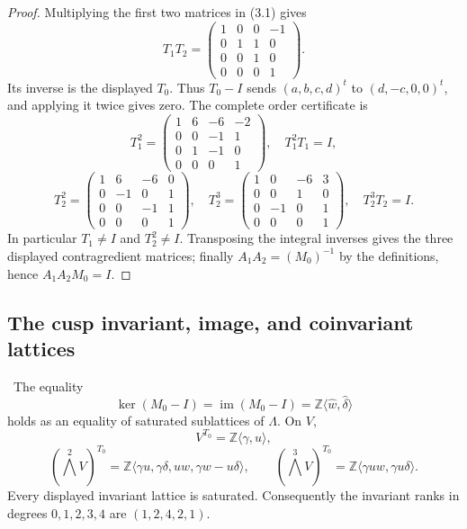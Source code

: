 \begin{proof}
Multiplying the first two matrices in (3.1) gives
\[
T_1T_2=
\begin{pmatrix}
1&0&0&-1\\0&1&1&0\\0&0&1&0\\0&0&0&1
\end{pmatrix}.
\]
Its inverse is the displayed $T_0$.  Thus
$T_0-I$ sends $(a,b,c,d)^t$ to $(d,-c,0,0)^t$, and applying it twice
gives zero.  The complete order certificate is
\[
T_1^2=
\begin{pmatrix}
1&6&-6&-2\\0&0&-1&1\\0&1&-1&0\\0&0&0&1
\end{pmatrix},
\quad T_1^2T_1=I,
\]
\[
T_2^2=
\begin{pmatrix}
1&6&-6&0\\0&-1&0&1\\0&0&-1&1\\0&0&0&1
\end{pmatrix},
\quad
T_2^3=
\begin{pmatrix}
1&0&-6&3\\0&0&1&0\\0&-1&0&1\\0&0&0&1
\end{pmatrix},
\quad T_2^3T_2=I.
\]
In particular $T_1\ne I$ and $T_2^2\ne I$.  Transposing the integral inverses gives
the three displayed contragredient matrices; finally
$A_1A_2=(M_0)^{-1}$ by the definitions, hence $A_1A_2M_0=I$.
\end{proof}

\subsection{The cusp invariant, image, and coinvariant lattices}

\begin{theorem}
\label{wb:thm:cusp-lattices}
\ The equality
\[
 \ker(M_0-I)=\operatorname{im}(M_0-I)
 =\mathbb Z\langle\widehat w,\widehat\delta\rangle
\tag{3.2}
\]
holds as an equality of saturated sublattices of $\Lambda$.  On $V$,
\[
V^{T_0}=\mathbb Z\langle\gamma,u\rangle,
\]
\[
(\textstyle\bigwedge^2V)^{T_0}
=\mathbb Z\langle
\gamma u,\gamma\delta,uw,\gamma w-u\delta\rangle ,
\qquad
(\textstyle\bigwedge^3V)^{T_0}
=\mathbb Z\langle\gamma uw,\gamma u\delta\rangle .
\tag{3.3}
\]
Every displayed invariant lattice is saturated.  Consequently the invariant
ranks in degrees $0,1,2,3,4$ are $(1,2,4,2,1)$.
\end{theorem}

